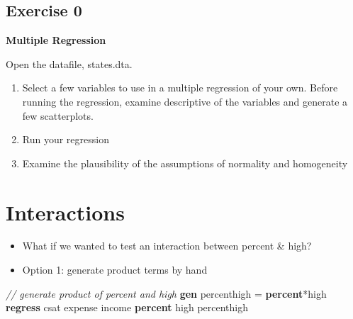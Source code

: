 \documentclass[
]{book}
\newenvironment{Shaded}{\begin{snugshade}}{\end{snugshade}}
\newcommand{\CommentTok}[1]{\textcolor[rgb]{0.56,0.35,0.01}{\textit{#1}}}
\newcommand{\KeywordTok}[1]{\textcolor[rgb]{0.13,0.29,0.53}{\textbf{#1}}}
\newcommand{\NormalTok}[1]{#1}
\providecommand{\tightlist}{%
  \setlength{\itemsep}{0pt}\setlength{\parskip}{0pt}}
\begin{document}
\hypertarget{exercise-0-7}{%
\subsection{Exercise 0}\label{exercise-0-7}}

\textbf{Multiple Regression}

Open the datafile, states.dta.

\begin{enumerate}
\def\labelenumi{\arabic{enumi}.}
\tightlist
\item
  Select a few variables to use in a multiple regression of your own. Before running the regression, examine descriptive of the variables and generate a few scatterplots.
\item
  Run your regression
\item
  Examine the plausibility of the assumptions of normality and homogeneity
\end{enumerate}

\hypertarget{interactions}{%
\section{Interactions}\label{interactions}}

\begin{itemize}
\tightlist
\item
  What if we wanted to test an interaction between percent \& high?
\item
  Option 1: generate product terms by hand
\end{itemize}

\begin{Shaded}
\begin{Highlighting}[]
  \CommentTok{// generate product of percent and high}
  \KeywordTok{gen}\NormalTok{ percenthigh = }\KeywordTok{percent}\NormalTok{*high }
  \KeywordTok{regress}\NormalTok{ csat expense income }\KeywordTok{percent}\NormalTok{ high percenthigh}
\end{Highlighting}
\end{Shaded}
\end{document}
